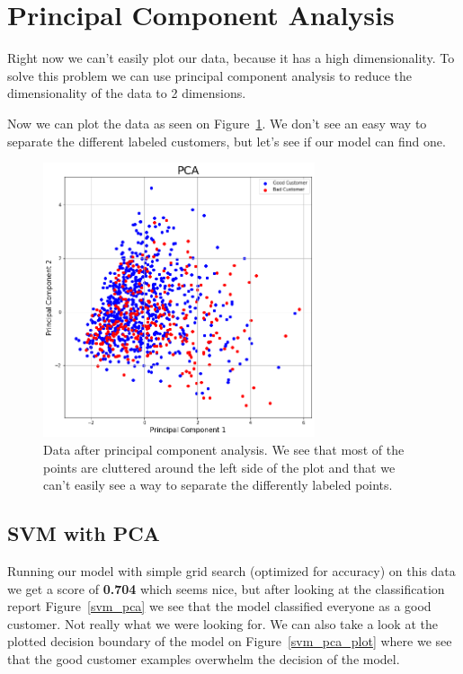 \documentclass[runningheads]{llncs}
\begin{document}
\section{Principal Component Analysis}
Right now we can't easily plot our data, because it has a high dimensionality. To solve this problem we can use principal component analysis \cite{sklearn_pca} to reduce the dimensionality of the data to 2 dimensions. 

Now we can plot the data as seen on Figure~\ref{pca}. We don't see an easy way to separate the different labeled customers, but let's see if our model can find one.

\begin{figure}[h]
\includegraphics[width=8cm]{images/pca.png}
\centering
\caption{Data after principal component analysis. We see that most of the points are cluttered around the left side of the plot and that we can't easily see a way to separate the differently labeled points.}
\label{pca}
\end{figure}

\subsection{SVM with PCA}

Running our model with simple grid search (optimized for accuracy) on this data we get a score of \textbf{0.704} which seems nice, but after looking at the classification report Figure~\ref{svm_pca} we see that the model classified everyone as a good customer. Not really what we were looking for. We can also take a look at the plotted decision boundary of the model on Figure~\ref{svm_pca_plot} where we see that the good customer examples overwhelm the decision of the model. 
\end{document}
